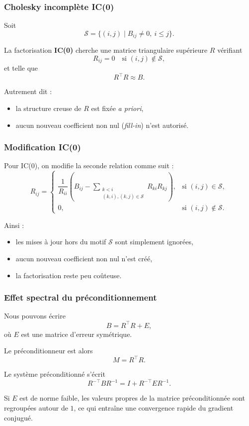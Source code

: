 \documentclass[usepdftitle=false,aspectratio=169]{beamer}
\begin{document}
\begin{frame}
\frametitle{Cholesky incomplète IC(0)}

	Soit
\[
\mathcal S = \{(i,j)\mid B_{ij} \neq 0,\ i \le j\}.
\]

La factorisation \textbf{IC(0)} cherche une matrice triangulaire supérieure $R$
vérifiant
\[
R_{ij} = 0 \quad \text{si } (i,j)\notin \mathcal S,
\]
et telle que
\[
R^\top R \approx B.
\]

Autrement dit :
\begin{itemize}
	\item la structure creuse de $R$ est fixée \emph{a priori},
	\item aucun nouveau coefficient non nul (\emph{fill-in}) n’est autorisé.
\end{itemize}

\end{frame}

\begin{frame}
\frametitle{Modification IC(0)}

Pour IC(0), on modifie la seconde relation comme suit :
\[
R_{ij} =
\begin{cases}
	\dfrac{1}{R_{ii}}
	\left(
	B_{ij}
	- \sum\limits_{\substack{k<i \\ (k,i),(k,j)\in\mathcal S}}
	R_{k i} R_{k j}
	\right),
	& \text{si } (i,j)\in\mathcal S, \\[2ex]
	0,
	& \text{si } (i,j)\notin\mathcal S.
\end{cases}
\]

Ainsi :
\begin{itemize}
	\item les mises à jour hors du motif $\mathcal S$ sont simplement ignorées,
	\item aucun nouveau coefficient non nul n’est créé,
	\item la factorisation reste peu coûteuse.
\end{itemize}

\end{frame}

\begin{frame}
\frametitle{Effet spectral du préconditionnement}

Nous pouvons écrire
\[
B = R^\top R + E,
\]
où $E$ est une matrice d’erreur symétrique.

Le préconditionneur est alors
\[
M = R^\top R.
\]

Le système préconditionné s’écrit
\[
R^{-\top} B R^{-1}
= I + R^{-\top} E R^{-1}.
\]

Si $E$ est de norme faible, les valeurs propres de la matrice préconditionnée
sont regroupées autour de $1$, ce qui entraîne une convergence rapide
du gradient conjugué.

\end{frame}
\end{document}
